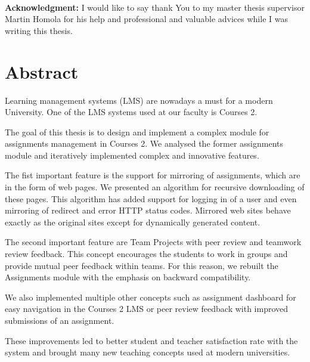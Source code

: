 \documentclass[12pt, oneside]{book}
\begin{document}
\frontmatter

\setcounter{page}{3}
\newpage 

\begin{minipage}{0.25\textwidth}~\end{minipage}
\begin{minipage}{0.68\textwidth}
{\bf Acknowledgment:} I would like to say thank You to my master thesis supervisor Martin Homola for his help and professional and valuable advices while I was writing this thesis.\bigskip\bigskip

\end{minipage}
\newpage


\newpage 
\chapter*{Abstract}

Learning management systems (LMS) are nowadays a must for a modern University. One of the LMS systems used at our faculty is Courses 2.

The goal of this thesis is to design and implement a complex module for assignments management in Courses 2. We analysed the former assignments module and iteratively implemented complex and innovative features. 

The fist important feature is the support for mirroring of assignments, which are in the form of web pages. We presented an algorithm for recursive downloading of these pages. This algorithm has added support for logging in of a user and even mirroring of redirect and error HTTP status codes. Mirrored web sites behave exactly as the original sites except for dynamically generated content.

The second important feature are Team Projects with peer review and teamwork review feedback. This concept encourages the students to work in groups and provide mutual peer feedback within teams. For this reason, we rebuilt the Assignments module with the emphasis on backward compatibility.

We also implemented multiple other concepts such as assignment dashboard for easy navigation in the Courses 2 LMS or peer review feedback with improved submissions of an assignment.

These improvements led to better student and teacher satisfaction rate with the system and brought many new teaching concepts used at modern universities.
\end{document}
